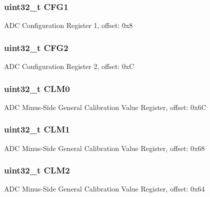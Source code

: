 \subsubsection[{C\+F\+G1}]{\setlength{\rightskip}{0pt plus 5cm}uint32\+\_\+t C\+F\+G1}\label{struct_a_d_c___mem_map_a50355545bc85131128f24459e40f1711}
A\+D\+C Configuration Register 1, offset\+: 0x8 \hypertarget{struct_a_d_c___mem_map_a46dbb5345ab79894e02fafa7ba9d8523}{}
\subsubsection[{C\+F\+G2}]{\setlength{\rightskip}{0pt plus 5cm}uint32\+\_\+t C\+F\+G2}\label{struct_a_d_c___mem_map_a46dbb5345ab79894e02fafa7ba9d8523}
A\+D\+C Configuration Register 2, offset\+: 0x\+C \hypertarget{struct_a_d_c___mem_map_a511c5f41f61227c49738a729b856bc26}{}
\subsubsection[{C\+L\+M0}]{\setlength{\rightskip}{0pt plus 5cm}uint32\+\_\+t C\+L\+M0}\label{struct_a_d_c___mem_map_a511c5f41f61227c49738a729b856bc26}
A\+D\+C Minus-\/\+Side General Calibration Value Register, offset\+: 0x6\+C \hypertarget{struct_a_d_c___mem_map_a846cc51f8b255a74920d53c497e690ee}{}
\subsubsection[{C\+L\+M1}]{\setlength{\rightskip}{0pt plus 5cm}uint32\+\_\+t C\+L\+M1}\label{struct_a_d_c___mem_map_a846cc51f8b255a74920d53c497e690ee}
A\+D\+C Minus-\/\+Side General Calibration Value Register, offset\+: 0x68 \hypertarget{struct_a_d_c___mem_map_a4efbf939e8f39accffa83b16f9607587}{}
\subsubsection[{C\+L\+M2}]{\setlength{\rightskip}{0pt plus 5cm}uint32\+\_\+t C\+L\+M2}\label{struct_a_d_c___mem_map_a4efbf939e8f39accffa83b16f9607587}
A\+D\+C Minus-\/\+Side General Calibration Value Register, offset\+: 0x64 \hypertarget{struct_a_d_c___mem_map_aadc0a60c45854df3d46a33790759ef5f}{}
